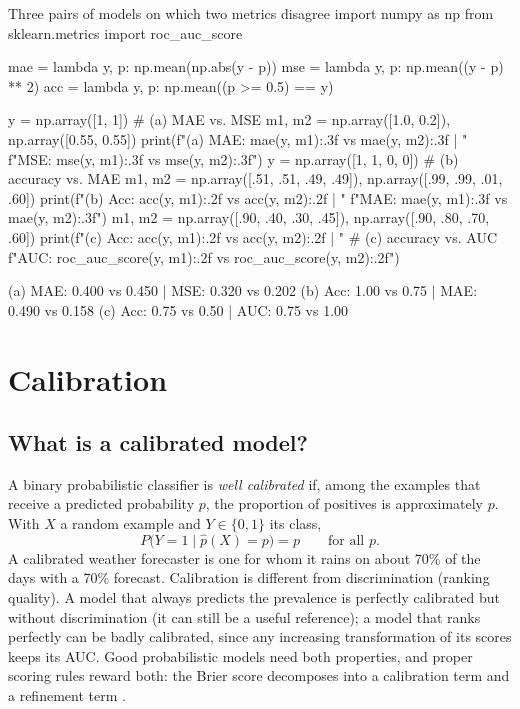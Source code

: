\begin{pylisting}[label={lst:disagree}]{Three pairs of models on which two metrics disagree}
import numpy as np
from sklearn.metrics import roc_auc_score

mae = lambda y, p: np.mean(np.abs(y - p))
mse = lambda y, p: np.mean((y - p) ** 2)
acc = lambda y, p: np.mean((p >= 0.5) == y)

y = np.array([1, 1])                                   # (a) MAE vs. MSE
m1, m2 = np.array([1.0, 0.2]), np.array([0.55, 0.55])
print(f"(a) MAE: {mae(y, m1):.3f} vs {mae(y, m2):.3f} | "
      f"MSE: {mse(y, m1):.3f} vs {mse(y, m2):.3f}")
y = np.array([1, 1, 0, 0])                             # (b) accuracy vs. MAE
m1, m2 = np.array([.51, .51, .49, .49]), np.array([.99, .99, .01, .60])
print(f"(b) Acc: {acc(y, m1):.2f} vs {acc(y, m2):.2f} | "
      f"MAE: {mae(y, m1):.3f} vs {mae(y, m2):.3f}")
m1, m2 = np.array([.90, .40, .30, .45]), np.array([.90, .80, .70, .60])
print(f"(c) Acc: {acc(y, m1):.2f} vs {acc(y, m2):.2f} | "    # (c) accuracy vs. AUC
      f"AUC: {roc_auc_score(y, m1):.2f} vs {roc_auc_score(y, m2):.2f}")
\end{pylisting}
\begin{pyoutput}
(a) MAE: 0.400 vs 0.450 | MSE: 0.320 vs 0.202
(b) Acc: 1.00 vs 0.75 | MAE: 0.490 vs 0.158
(c) Acc: 0.75 vs 0.50 | AUC: 0.75 vs 1.00
\end{pyoutput}

\section{Calibration}\label{sec:calibration}

\subsection{What is a calibrated model?}

A binary probabilistic classifier is \emph{well calibrated} if, among the examples that receive
a predicted probability $p$, the proportion of positives is approximately $p$. With $X$ a random example and $Y\in\{0,1\}$ its class,
\begin{equation}
  P\bigl(Y=1\mid\hat p(X)=p\bigr)=p\qquad\text{for all }p.
\end{equation}
A calibrated weather forecaster is one for whom it rains on about 70\% of the days with a 70\%
forecast. Calibration is different from discrimination (ranking quality). A model that always
predicts the prevalence is perfectly calibrated but without discrimination (it can still be a useful
reference); a model that ranks perfectly can
be badly calibrated, since any increasing transformation of its scores keeps its AUC. Good
probabilistic models need both properties, and proper scoring rules reward both: the Brier
score decomposes into a calibration term and a refinement term
\citep{degroot1983comparison}.

